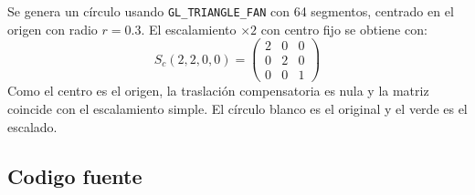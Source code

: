 \documentclass[12pt,a4paper]{article}
\begin{document}
Se genera un c\'irculo usando \texttt{GL\_TRIANGLE\_FAN} con 64 segmentos,
centrado en el origen con radio $r = 0.3$. El escalamiento $\times 2$
con centro fijo se obtiene con:
\[
S_c(2, 2, 0, 0) = \begin{pmatrix} 2 & 0 & 0 \\ 0 & 2 & 0 \\ 0 & 0 & 1 \end{pmatrix}
\]
Como el centro es el origen, la traslaci\'on compensatoria es nula y la
matriz coincide con el escalamiento simple. El c\'irculo blanco es el original
y el verde es el escalado.

\subsection{Codigo fuente}
\end{document}
